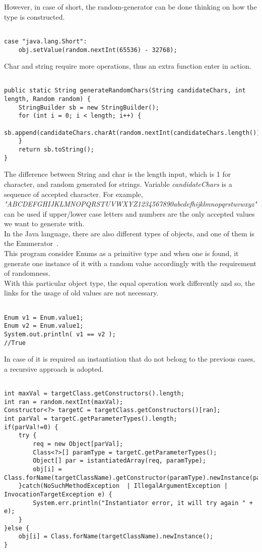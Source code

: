 However, in case of short, the random-generator can be done thinking on how the type is constructed.
\begin{lstlisting}[caption={Random short generator},label={lst:genShort}]% Start your code-block
	
case "java.lang.Short":
	obj.setValue(random.nextInt(65536) - 32768);
\end{lstlisting}
Char and string require more operations, thus an extra function enter in action.
\begin{lstlisting}[caption={Random String/char generator},label={lst:genString&Char}]% Start your code-block

public static String generateRandomChars(String candidateChars, int length, Random random) {
	StringBuilder sb = new StringBuilder();
	for (int i = 0; i < length; i++) {
		sb.append(candidateChars.charAt(random.nextInt(candidateChars.length())));
	}
	return sb.toString();
}
\end{lstlisting}
The difference between String and char is the length input, which is 1 for character, and random generated for strings.
Variable \emph{candidateChars} is a sequence of accepted character. 
For example, \emph{"ABCDEFGHIJKLMNOPQRSTUVWXYZ1234567890abcdefhijklmnopqrstuvwxyz"} can be used if upper/lower case letters and numbers are the only accepted values we want to generate with.\\
In the Java language, there are also different types of objects, and one of them is the Enumerator~\cite{enum}.\\
This program consider Enums as a primitive type and when one is found, it generate one instance of it with a random value accordingly with the requirement of randomness.\\
With this particular object type, the equal operation work differently and so, the links for the usage of old values are not necessary. 
\begin{lstlisting}[caption={Equality in enums},label={lst:enumEquality}]% Start your code-block

Enum v1 = Enum.value1;
Enum v2 = Enum.value1;
System.out.println( v1 == v2 );
//True
\end{lstlisting}
In case of it is required an instantiation that do not belong to the previous cases, a recursive approach is adopted.
\begin{lstlisting}[caption={non primitive/enums recursion},label={lst:recursion}]% Start your code-block

int maxVal = targetClass.getConstructors().length;
int ran = random.nextInt(maxVal);
Constructor<?> targetC = targetClass.getConstructors()[ran];
int parVal = targetC.getParameterTypes().length;
if(parVal!=0) {
	try {
		req = new Object[parVal];
		Class<?>[] paramType = targetC.getParameterTypes();
		Object[] par = istantiatedArray(req, paramType);
		obj[i] = Class.forName(targetClassName).getConstructor(paramType).newInstance(par);
	}catch(NoSuchMethodException  | IllegalArgumentException | InvocationTargetException e) {
		System.err.println("Instantiator error, it will try again " + e);
	}
}else {
	obj[i] = Class.forName(targetClassName).newInstance();
}
\end{lstlisting}
